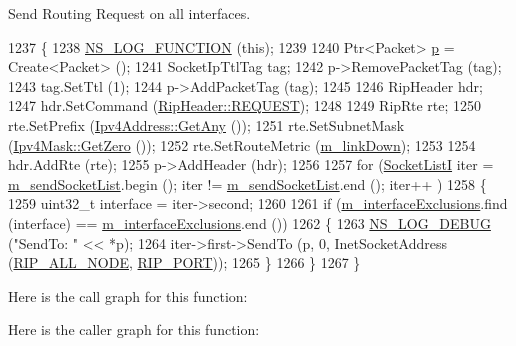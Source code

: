 Send Routing Request on all interfaces. 


\begin{DoxyCode}
1237 \{
1238   \hyperlink{log-macros-disabled_8h_a90b90d5bad1f39cb1b64923ea94c0761}{NS\_LOG\_FUNCTION} (\textcolor{keyword}{this});
1239 
1240   Ptr<Packet> \hyperlink{lte__link__budget_8m_ac9de518908a968428863f829398a4e62}{p} = Create<Packet> ();
1241   SocketIpTtlTag tag;
1242   p->RemovePacketTag (tag);
1243   tag.SetTtl (1);
1244   p->AddPacketTag (tag);
1245 
1246   RipHeader hdr;
1247   hdr.SetCommand (\hyperlink{classns3_1_1RipHeader_a8c6ce779ee35c8b65446aaa202a6e789aeebbe2c504f996111c13da75ec0212d2}{RipHeader::REQUEST});
1248 
1249   RipRte rte;
1250   rte.SetPrefix (\hyperlink{classns3_1_1Ipv4Address_a7a39b330c8e701183a411d5779fca1a4}{Ipv4Address::GetAny} ());
1251   rte.SetSubnetMask (\hyperlink{classns3_1_1Ipv4Mask_ac2dda492011ede8350008d753d278998}{Ipv4Mask::GetZero} ());
1252   rte.SetRouteMetric (\hyperlink{classns3_1_1Rip_a3f37d4c5176e380482edf0be82d2fc18}{m\_linkDown});
1253 
1254   hdr.AddRte (rte);
1255   p->AddHeader (hdr);
1256 
1257   \textcolor{keywordflow}{for} (\hyperlink{classns3_1_1Rip_a0395b3977eeeb90190ccfa5758a3957f}{SocketListI} iter = \hyperlink{classns3_1_1Rip_a58b5f6ebcee2ed04249fd025abfa61cb}{m\_sendSocketList}.begin (); iter != 
      \hyperlink{classns3_1_1Rip_a58b5f6ebcee2ed04249fd025abfa61cb}{m\_sendSocketList}.end (); iter++ )
1258     \{
1259       uint32\_t \textcolor{keyword}{interface }= iter->second;
1260 
1261       \textcolor{keywordflow}{if} (\hyperlink{classns3_1_1Rip_a30e2c00645f24a3b29be981f5d592773}{m\_interfaceExclusions}.find (interface) == 
      \hyperlink{classns3_1_1Rip_a30e2c00645f24a3b29be981f5d592773}{m\_interfaceExclusions}.end ())
1262         \{
1263           \hyperlink{group__logging_ga413f1886406d49f59a6a0a89b77b4d0a}{NS\_LOG\_DEBUG} (\textcolor{stringliteral}{"SendTo: "} << *p);
1264           iter->first->SendTo (p, 0, InetSocketAddress (\hyperlink{rip_8cc_a4088e07a51c9aabba6666b6c1e85f704}{RIP\_ALL\_NODE}, 
      \hyperlink{rip_8cc_a6af26a435808c34ee4f8876792a5682a}{RIP\_PORT}));
1265         \}
1266     \}
1267 \}
\end{DoxyCode}


Here is the call graph for this function\+:




Here is the caller graph for this function\+:


